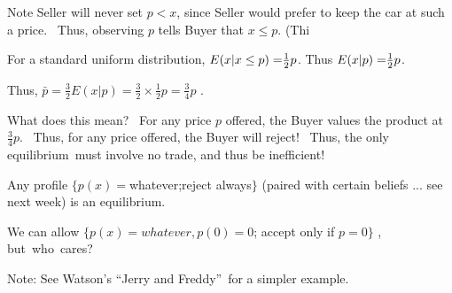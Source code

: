 \documentclass[handout]{beamer}
\begin{document}
\begin{frame}%

Note Seller will never set $p<x$, since Seller would prefer to keep the car
at such a price. \ Thus, observing $p$ tells Buyer that $x\leq p$.
(Thi\bigskip 

\pause%
{\footnotesize For a standard uniform distribution,} ${\footnotesize %
E(x|x\leq p)=}\frac{1}{2}{\footnotesize p}$. {\footnotesize Thus} $%
{\footnotesize E(x|p)=}\frac{1}{2}{\footnotesize p}$.

\pause%
Thus, $\bar{p}=\frac{3}{2}E(x|p)=\frac{3}{2}\times \frac{1}{2}p=\frac{3}{4}p$%
.\bigskip

\pause%
What does this mean? \ For any price $p$ offered, the Buyer values the
product at $\frac{3}{4}p$. \ Thus, for any price offered, the Buyer will
reject! \ Thus, the only equilibrium\ must involve no trade, and thus be
inefficient!

\end{frame}%

\begin{frame}%

Any profile $\{p(x)=$whatever;reject always$\}$ {\footnotesize (paired with
certain beliefs ... see next week) }is an equilibrium.

\bigskip

We can allow $\{p(x)=whatever,p(0)=0$; accept only if $p=0\}$ ,
but~who~cares?

\bigskip

{\footnotesize Note: See Watson's \textquotedblleft Jerry and
Freddy\textquotedblright\ for a simpler example.}

\end{frame}%
\end{document}
